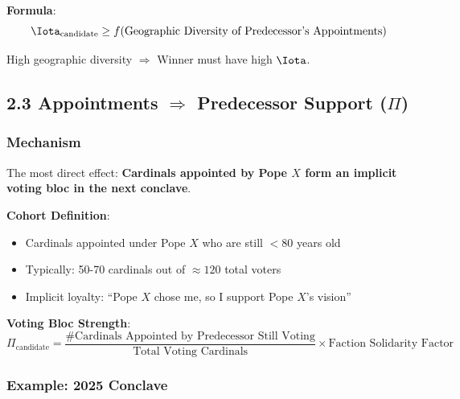 \textbf{Formula}:
\begin{equation}
\Iota_{\text{candidate}} \geq f(\text{Geographic Diversity of Predecessor's Appointments})
\end{equation}

High geographic diversity $\Rightarrow$ Winner must have high $\Iota$.

\subsection{2.3 Appointments $\Rightarrow$ Predecessor Support ($\Pi$)}

\subsubsection{Mechanism}

The most direct effect: \textbf{Cardinals appointed by Pope $X$ form an implicit voting bloc in the next conclave}.

\textbf{Cohort Definition}:
\begin{itemize}
\item Cardinals appointed under Pope $X$ who are still $<80$ years old
\item Typically: 50-70 cardinals out of $\approx 120$ total voters
\item Implicit loyalty: ``Pope $X$ chose me, so I support Pope $X$'s vision''
\end{itemize}

\textbf{Voting Bloc Strength}:
\begin{equation}
\Pi_{\text{candidate}} = \frac{\text{\# Cardinals Appointed by Predecessor Still Voting}}{\text{Total Voting Cardinals}} \times \text{Faction Solidarity Factor}
\end{equation}

\subsubsection{Example: 2025 Conclave}

